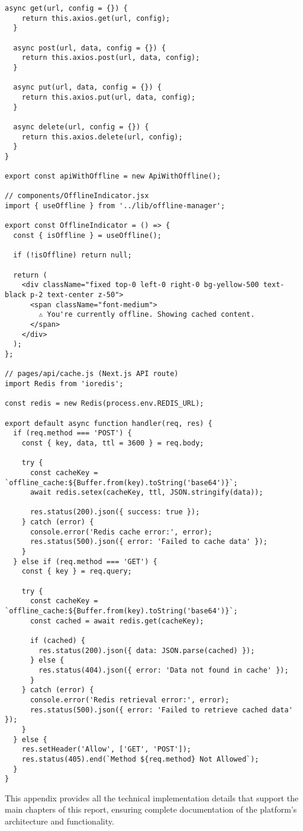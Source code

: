 \begin{lstlisting}[caption={Offline Mode Implementation}, captionpos=b, breaklines=true]
  async get(url, config = {}) {
    return this.axios.get(url, config);
  }

  async post(url, data, config = {}) {
    return this.axios.post(url, data, config);
  }

  async put(url, data, config = {}) {
    return this.axios.put(url, data, config);
  }

  async delete(url, config = {}) {
    return this.axios.delete(url, config);
  }
}

export const apiWithOffline = new ApiWithOffline();

// components/OfflineIndicator.jsx
import { useOffline } from '../lib/offline-manager';

export const OfflineIndicator = () => {
  const { isOffline } = useOffline();

  if (!isOffline) return null;

  return (
    <div className="fixed top-0 left-0 right-0 bg-yellow-500 text-black p-2 text-center z-50">
      <span className="font-medium">
        ⚠️ You're currently offline. Showing cached content.
      </span>
    </div>
  );
};

// pages/api/cache.js (Next.js API route)
import Redis from 'ioredis';

const redis = new Redis(process.env.REDIS_URL);

export default async function handler(req, res) {
  if (req.method === 'POST') {
    const { key, data, ttl = 3600 } = req.body;
    
    try {
      const cacheKey = `offline_cache:${Buffer.from(key).toString('base64')}`;
      await redis.setex(cacheKey, ttl, JSON.stringify(data));
      
      res.status(200).json({ success: true });
    } catch (error) {
      console.error('Redis cache error:', error);
      res.status(500).json({ error: 'Failed to cache data' });
    }
  } else if (req.method === 'GET') {
    const { key } = req.query;
    
    try {
      const cacheKey = `offline_cache:${Buffer.from(key).toString('base64')}`;
      const cached = await redis.get(cacheKey);
      
      if (cached) {
        res.status(200).json({ data: JSON.parse(cached) });
      } else {
        res.status(404).json({ error: 'Data not found in cache' });
      }
    } catch (error) {
      console.error('Redis retrieval error:', error);
      res.status(500).json({ error: 'Failed to retrieve cached data' });
    }
  } else {
    res.setHeader('Allow', ['GET', 'POST']);
    res.status(405).end(`Method ${req.method} Not Allowed`);
  }
}
\end{lstlisting}

This appendix provides all the technical implementation details that support the main chapters of this report, ensuring complete documentation of the platform's architecture and functionality.

